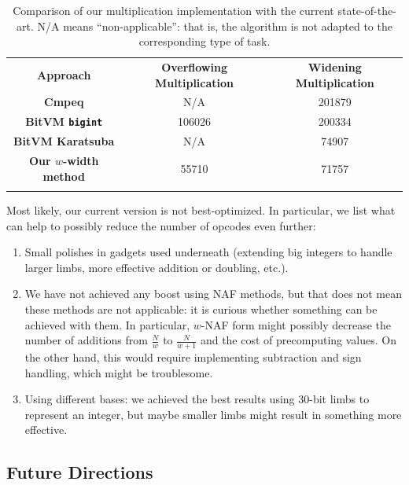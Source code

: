 \documentclass{iacrtrans}
\begin{document}
\begin{table}[h]
\centering
\begin{tabular}{ccc} 
\hline
\textbf{Approach} & \textbf{Overflowing Multiplication} & \textbf{Widening Multiplication} \\ \Xhline{3\arrayrulewidth}
  \textbf{Cmpeq} & N/A & \num[group-separator={,}]{201879} \\ \hline
  \textbf{BitVM \texttt{bigint}} & \num[group-separator={,}]{106026} & \num[group-separator={,}]{200334} \\ \hline
 \textbf{BitVM Karatsuba} & N/A & 	
    \num[group-separator={,}]{74907} \\ \hdashline
  \textbf{Our $w$-width method} & \num[group-separator={,}]{55710} & \num[group-separator={,}]{71757} \\ 
\Xhline{3\arrayrulewidth}
\end{tabular}
\caption{Comparison of our multiplication implementation with the current state-of-the-art. N/A means ``non-applicable'': that is, the algorithm is not adapted to the corresponding type of task.}
\label{tab:mulcomparison}
\end{table}

Most likely, our current version is not best-optimized. In particular, we list what can help to possibly reduce the number of opcodes even further:
\begin{enumerate}
    \item Small polishes in gadgets used underneath (extending big integers to handle larger limbs, more effective addition or doubling, etc.).
    \item We have not achieved any boost using NAF methods, but that does not mean these methods are not applicable: it is curious whether something can be achieved with them. In particular, $w$-NAF form might possibly decrease the number of additions from $\frac{N}{w}$ to $\frac{N}{w+1}$ and the cost of precomputing values. On the other hand, this would require implementing subtraction and sign handling, which might be troublesome.
    \item Using different bases: we achieved the best results using 30-bit limbs to represent an integer, but maybe smaller limbs might result in something more effective.
\end{enumerate}

\subsection{Future Directions}
\end{document}
